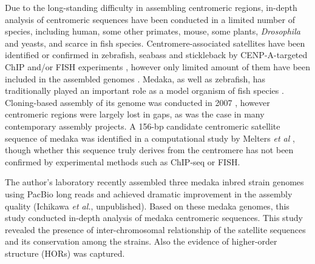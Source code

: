 Due to the long-standing difficulty in assembling centromeric regions, in-depth analysis of centromeric sequences have been conducted in a limited number of species, including human, some other primates, mouse, some plants, \textit{Drosophila} and yeasts, and scarce in fish species. Centromere-associated satellites have been identified or confirmed in zebrafish, seabass and stickleback by CENP-A-targeted ChIP and/or FISH experiments \cite{Phillips2000, Kuznetsova2014, Cech2015}, however only limited amount of them have been included in the assembled genomes \cite{Howe2013, Vij2016, Cech2015}. Medaka, as well as zebrafish, has traditionally played an important role as a model organism of fish species \cite{Wittbrodt2002}. Cloning-based assembly of its genome was conducted in 2007 \cite{Kasahara2007}, however centromeric regions were largely lost in gaps, as was the case in many contemporary assembly projects. A 156-bp candidate centromeric satellite sequence of medaka was identified in a computational study by Melters \textit{et al} \cite{Melters2013}, though whether this sequence truly derives from the centromere has not been confirmed by experimental methods such as ChIP-seq or FISH.

The author's laboratory recently assembled three medaka inbred strain genomes using PacBio long reads and achieved dramatic improvement in the assembly quality (Ichikawa \textit{et al.}, unpublished). Based on these medaka genomes, this study conducted in-depth analysis of medaka centromeric sequences. This study revealed the presence of inter-chromosomal relationship of the satellite sequences and its conservation among the strains. Also the evidence of higher-order structure (HORs) was captured.
